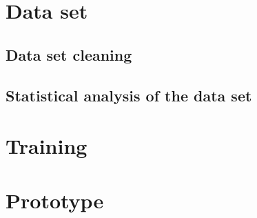 \section{Data set}
\label{sec:Data-Set}

\subsection{Data set cleaning}
\label{sub:Data-Set-Cleaning}

\subsection{Statistical analysis of the data set}
\label{sub:Statistical-Analysis-Data-Set}

\section{Training}
\label{sec:Training}

\section{Prototype}
\label{sec:Prototype}
